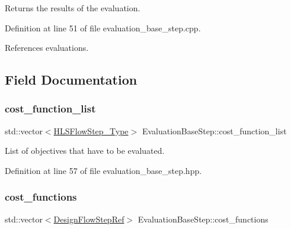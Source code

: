 Returns the results of the evaluation. 



Definition at line 51 of file evaluation\+\_\+base\+\_\+step.\+cpp.



References evaluations.



\subsection{Field Documentation}
\mbox{\label{classEvaluationBaseStep_af91f1c56d40e88db533715ba41c89396}} 
\subsubsection{\texorpdfstring{cost\+\_\+function\+\_\+list}{cost\_function\_list}}
{\footnotesize\ttfamily std\+::vector$<$\hyperlink{hls__step_8hpp_ada16bc22905016180e26fc7e39537f8d}{H\+L\+S\+Flow\+Step\+\_\+\+Type}$>$ Evaluation\+Base\+Step\+::cost\+\_\+function\+\_\+list\hspace{0.3cm}{\ttfamily [protected]}}



List of objectives that have to be evaluated. 



Definition at line 57 of file evaluation\+\_\+base\+\_\+step.\+hpp.

\mbox{\label{classEvaluationBaseStep_abdac7bdf7843ec1eb93765ee68ce7a17}} 
\subsubsection{\texorpdfstring{cost\+\_\+functions}{cost\_functions}}
{\footnotesize\ttfamily std\+::vector$<$\hyperlink{design__flow__step_8hpp_a9dd6b4474ddf52d41a78b1aaa12ae6c8}{Design\+Flow\+Step\+Ref}$>$ Evaluation\+Base\+Step\+::cost\+\_\+functions\hspace{0.3cm}{\ttfamily [protected]}}



